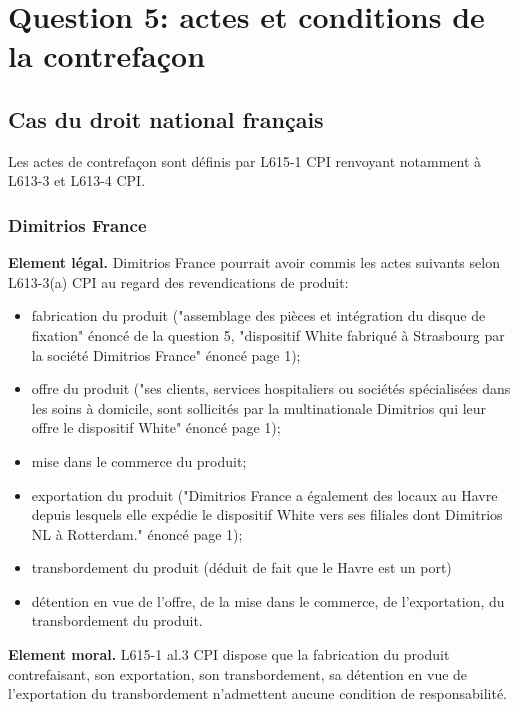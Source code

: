 \section{Question 5: actes et conditions de la contrefaçon}

\subsection{Cas du droit national français}

Les actes de contrefaçon sont définis par L615-1 CPI renvoyant notamment à
L613-3 et L613-4 CPI.

\subsubsection{Dimitrios France}

\textbf{Element légal.} Dimitrios France pourrait avoir commis les actes suivants selon L613-3(a) CPI
au regard des revendications de produit:
\begin{itemize}
    \item fabrication du produit ("assemblage des pièces et intégration du
    disque de fixation" énoncé de la question 5, "dispositif White fabriqué
    à Strasbourg par la société Dimitrios France" énoncé page 1);
    \item offre du produit ("ses clients, services hospitaliers ou sociétés
    spécialisées dans les soins à domicile, sont sollicités par la multinationale
    Dimitrios qui leur offre le dispositif White" énoncé page 1);
    \item mise dans le commerce du produit;
    \item exportation du produit ("Dimitrios France a également des locaux
    au Havre depuis lesquels elle expédie le dispositif White vers ses filiales
    dont Dimitrios NL à Rotterdam." énoncé page 1);
    \item transbordement du produit (déduit de fait que le Havre est un port)
    \item détention en vue de l'offre, de la mise dans le commerce, 
    de l'exportation, du transbordement du produit.\\
\end{itemize}

\textbf{Element moral.} L615-1 al.3 CPI dispose que la fabrication du produit contrefaisant, son exportation,
son transbordement, sa détention en vue de l'exportation du transbordement n'admettent
aucune condition de responsabilité.\\

